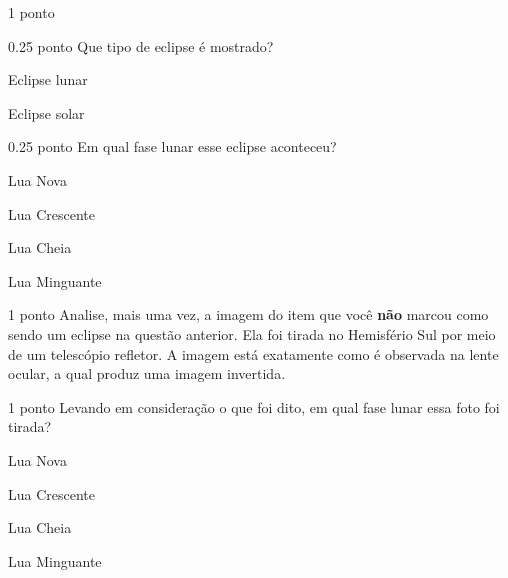 \documentclass{../lista}
\begin{document}
\begin{questao}{1 ponto}
		\begin{pergunta}{0.25 ponto}
			Que tipo de eclipse é mostrado?
			\begin{alternativas}
				\item Eclipse lunar
				\item Eclipse solar
			\end{alternativas}
		\end{pergunta}
		
		\begin{pergunta}{0.25 ponto}
			Em qual fase lunar esse eclipse aconteceu?
			\begin{alternativas}
				\item Lua Nova
				\item Lua Crescente
				\item Lua Cheia
				\item Lua Minguante
			\end{alternativas}
		\end{pergunta}
	\end{questao}

	\begin{questao}{1 ponto}
		Analise, mais uma vez, a imagem do item que você \textbf{não} marcou como sendo um eclipse na questão anterior. Ela foi tirada no Hemisfério Sul por meio de um telescópio refletor. A imagem está exatamente como é observada na lente ocular, a qual produz uma imagem invertida.
		\begin{pergunta}{1 ponto}
			Levando em consideração o que foi dito, em qual fase lunar essa foto foi tirada?
			\begin{alternativas}
				\item Lua Nova
				\item Lua Crescente
				\item Lua Cheia
				\item Lua Minguante
			\end{alternativas}
		\end{pergunta}
	\end{questao}
\end{document}
